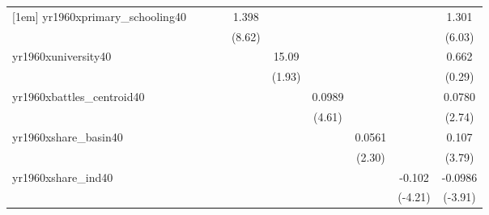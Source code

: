 {\begin{tabular}{l*{9}{c}}
[1em]
yr1960xprimary\_schooling40&                     &                     &                     &       1.398\sym{***}&                     &                     &                     &                     &       1.301\sym{***}\\
            &                     &                     &                     &      (8.62)         &                     &                     &                     &                     &      (6.03)         \\
[1em]
yr1960xuniversity40&                     &                     &                     &                     &       15.09         &                     &                     &                     &       0.662         \\
            &                     &                     &                     &                     &      (1.93)         &                     &                     &                     &      (0.29)         \\
[1em]
yr1960xbattles\_centroid40&                     &                     &                     &                     &                     &      0.0989\sym{***}&                     &                     &      0.0780\sym{**} \\
            &                     &                     &                     &                     &                     &      (4.61)         &                     &                     &      (2.74)         \\
[1em]
yr1960xshare\_basin40&                     &                     &                     &                     &                     &                     &      0.0561\sym{*}  &                     &       0.107\sym{***}\\
            &                     &                     &                     &                     &                     &                     &      (2.30)         &                     &      (3.79)         \\
[1em]
yr1960xshare\_ind40&                     &                     &                     &                     &                     &                     &                     &      -0.102\sym{***}&     -0.0986\sym{***}\\
            &                     &                     &                     &                     &                     &                     &                     &     (-4.21)         &     (-3.91)         \\

\end{tabular}}
